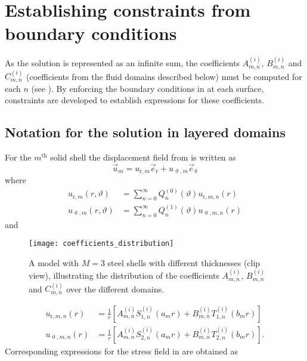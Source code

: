 \section{Establishing constraints from boundary conditions}
\label{Sec1:estabConstraints}
As the solution is represented as an infinite sum, the coefficients $A_{m,n}^{(i)}$, $B_{m,n}^{(i)}$ and $C_{m,n}^{(i)}$ (coefficients from the fluid domains described below) must be computed for each $n$ (see ). By enforcing the boundary conditions in  at each surface, constraints are developed to establish expressions for these coefficients.

\subsection{Notation for the solution in layered domains}
For the $m^{\mathrm{th}}$ solid shell the displacement field from  is written as
\begin{equation}
	\vec{u}_m = u_{\mathrm{r},m} \vec{e}_{\mathrm{r}} + u_{\upvartheta,m} \vec{e}_\upvartheta
\end{equation}
where
\begin{align}
	u_{\mathrm{r},m}(r,\vartheta) &= \sum_{n=0}^\infty Q_n^{(0)}(\vartheta)u_{\mathrm{r},m,n}(r) \label{Eq1:u_r}\\
	u_{\upvartheta,m}(r,\vartheta) &= \sum_{n=0}^\infty Q_n^{(1)}(\vartheta)u_{\upvartheta,m,n}(r)
\end{align}
and 
\begin{figure}
	\centering
	\texttt{[image: coefficients\_distribution]}
	\caption{A model with $M=3$ steel shells with different thicknesses (clip view), illustrating the distribution of the coefficients $A_{m,n}^{(i)}$, $B_{m,n}^{(i)}$ and $C_{m,n}^{(i)}$ over the different domains.}
	\label{Fig1:coefficients}
\end{figure}
\begin{align}
	u_{\mathrm{r},m,n}(r) &= \frac{1}{r}\left[A_{m,n}^{(i)}S_{1,n}^{(i)}(a_m r)+B_{m,n}^{(i)}T_{1,n}^{(i)}(b_m r)\right]\\
	u_{\upvartheta,m,n}(r) &= \frac{1}{r}\left[A_{m,n}^{(i)}S_{2,n}^{(i)}(a_m r)+B_{m,n}^{(i)}T_{2,n}^{(i)}(b_m r)\right].
\end{align}
Corresponding expressions for the stress field in  are obtained as
